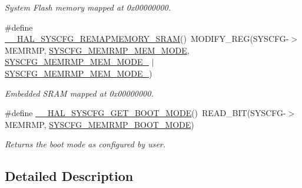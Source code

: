 \begin{DoxyCompactItemize}
\begin{DoxyCompactList}\small\item\em System Flash memory mapped at 0x00000000. \end{DoxyCompactList}\item 
\hypertarget{group___s_y_s_c_f_g___boot_mode_config_ga86d36fdb1571fd56ffeecfaed80c6805}{\#define \hyperlink{group___s_y_s_c_f_g___boot_mode_config_ga86d36fdb1571fd56ffeecfaed80c6805}{\-\_\-\-\_\-\-H\-A\-L\-\_\-\-S\-Y\-S\-C\-F\-G\-\_\-\-R\-E\-M\-A\-P\-M\-E\-M\-O\-R\-Y\-\_\-\-S\-R\-A\-M}()~M\-O\-D\-I\-F\-Y\-\_\-\-R\-E\-G(S\-Y\-S\-C\-F\-G-\/$>$M\-E\-M\-R\-M\-P, \hyperlink{group___peripheral___registers___bits___definition_ga3c05039ec67573c00da29f58b914f258}{S\-Y\-S\-C\-F\-G\-\_\-\-M\-E\-M\-R\-M\-P\-\_\-\-M\-E\-M\-\_\-\-M\-O\-D\-E}, \hyperlink{group___peripheral___registers___bits___definition_ga30d5f406535f94faea2e7f924d50201b}{S\-Y\-S\-C\-F\-G\-\_\-\-M\-E\-M\-R\-M\-P\-\_\-\-M\-E\-M\-\_\-\-M\-O\-D\-E\-\_} $\vert$ \hyperlink{group___peripheral___registers___bits___definition_gab5d76e8b4d801b35c31ef352b33407be}{S\-Y\-S\-C\-F\-G\-\_\-\-M\-E\-M\-R\-M\-P\-\_\-\-M\-E\-M\-\_\-\-M\-O\-D\-E\-\_})}\label{group___s_y_s_c_f_g___boot_mode_config_ga86d36fdb1571fd56ffeecfaed80c6805}

\begin{DoxyCompactList}\small\item\em Embedded S\-R\-A\-M mapped at 0x00000000. \end{DoxyCompactList}\item 
\#define \hyperlink{group___s_y_s_c_f_g___boot_mode_config_ga0e71eb2b553f1a7b8172710184a89caa}{\-\_\-\-\_\-\-H\-A\-L\-\_\-\-S\-Y\-S\-C\-F\-G\-\_\-\-G\-E\-T\-\_\-\-B\-O\-O\-T\-\_\-\-M\-O\-D\-E}()~R\-E\-A\-D\-\_\-\-B\-I\-T(S\-Y\-S\-C\-F\-G-\/$>$M\-E\-M\-R\-M\-P, \hyperlink{group___peripheral___registers___bits___definition_ga38d77b745bf303f4f353c7029591102b}{S\-Y\-S\-C\-F\-G\-\_\-\-M\-E\-M\-R\-M\-P\-\_\-\-B\-O\-O\-T\-\_\-\-M\-O\-D\-E})
\begin{DoxyCompactList}\small\item\em Returns the boot mode as configured by user. \end{DoxyCompactList}\end{DoxyCompactItemize}


\subsection{Detailed Description}


